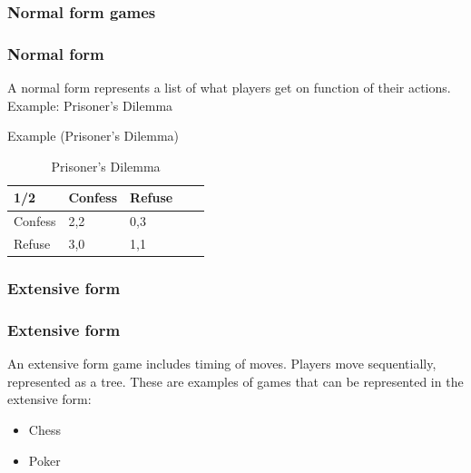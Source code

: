 \documentclass[aspectratio=169]{beamer}
\begin{document}
\begin{frame}
\subsubsection{Normal form games}
  \frametitle{Normal form}   %
A normal form represents a list of what players get on function of their actions. Example: Prisoner's Dilemma
\begin{exampleblock}{Example (Prisoner's Dilemma)}
\begin{table}[h!]
\centering
\begin{tabular}{lllll}

\multicolumn{1}{l}{1/2} \vline  & \multicolumn{1}{l}{Confess} & \multicolumn{1}{l}{Refuse}  \\ 
\hline
Confess                       &2,2                                  & 0,3				
\\
Refuse                          &3,0                                    & 1,1                                     
                          
\end{tabular}
\caption{Prisoner's Dilemma}
\label{table:7}
\end{table}
  \end{exampleblock}
\end{frame}
\note[enumerate]       %
{                      %

}
\begin{frame}
\subsubsection{Extensive form}
  \frametitle{Extensive form}   %
An extensive form game includes timing of moves. Players move sequentially, represented as a tree. These are examples of games that can be represented in the extensive form:
\begin{itemize}
	\item<1-> Chess 
	\item<2-> Poker 
 \end{itemize}
  
\end{frame}
\end{document}
